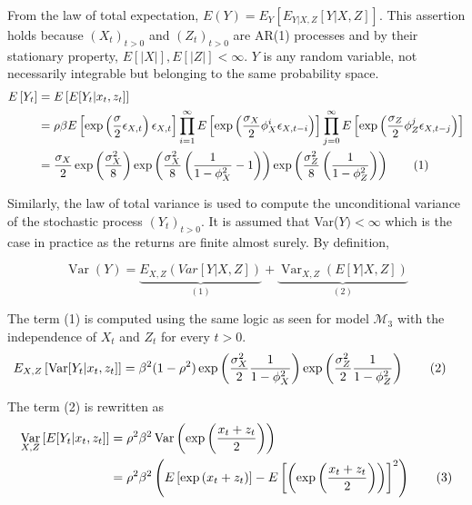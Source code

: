 \documentclass[11pt,a4,twosided,singlespacing,titlepagenumber=on]{scrreprt}
\numberwithin{equation}{chapter} %
\theoremstyle{remark}
\DeclareMathOperator{\var}{Var}
\newcommand\numberthis{\addtocounter{equation}{1}\tag{\theequation}}
\begin{document}
From the law of total expectation, $E(Y) = E_Y\left[ E_{Y|X,Z}[Y | X, Z] \right]$. This assertion holds because $(X_t)_{t>0}$ and $(Z_t)_{t>0}$ are AR(1) processes and by their stationary property, $E[|X|],E[|Z|] < \infty$. $Y$ is any random variable, not necessarily integrable but belonging to the same probability space.
\begin{align*}
E\left[ Y_t \right] &= E\left[ E[Y_t | x_t, z_t] \right] \\
                                  &= \rho \beta E\left[\exp \left( \frac{\sigma}{2} \epsilon_{X,t} \right) \epsilon_{X,t} \right] \prod_{i=1}^\infty E\left[\exp \left( \frac{\sigma_X}{2} \phi_X^i \epsilon_{X, t-i} \right)  \right]  \prod_{j=0}^\infty E\left[\exp \left( \frac{\sigma_Z}{2} \phi_Z^j \epsilon_{X, t-j} \right)  \right] \\
                  &= \frac{\sigma_X}{2} \exp \left(\frac{\sigma_X^2}{8}\right) \exp \left( \frac{\sigma_X^2}{8} \left(\frac{1}{1-\phi_X^{2}} - 1\right)\right) \exp \left( \frac{\sigma_Z^2}{8} \left(\frac{1}{1-\phi_Z^{2}}\right)\right) \numberthis \\
\end{align*}


Similarly, the law of total variance is used to compute the unconditional variance of the stochastic process $(Y_t)_{t>0}$. It is assumed that Var($Y) < \infty$ which is the case in practice as the returns are finite almost surely. By definition,

\begin{equation}
\var(Y) = \underbrace{E_{X,Z}(Var[Y|X,Z])}_{(1)} + \underbrace{\var_{X,Z}(E[Y|X,Z])}_{(2)}
\end{equation}


The term (1) is computed using the same logic as seen for model $\mathcal{M}_3$ with the independence of $X_t$ and $Z_t$ for every $t > 0$.
\begin{align*}
E_{X,Z}\left[ \var[Y_t | x_t, z_t] \right] &= \beta^2 (1-\rho^2) \exp \left( \frac{\sigma_X^2}{2} \frac{1}{1-\phi_X^{2}}\right) \exp \left( \frac{\sigma_Z^2}{2} \frac{1}{1-\phi_Z^{2}}\right) \numberthis
\end{align*}


The term (2) is rewritten as
\begin{align*}
\var_{X,Z} \left[ E[Y_t | x_t, z_t] \right] &= \rho^2 \beta^2 \var \left( \exp \left(\frac{x_t + z_t}{2}\right) \right) \\
                                                  &= \rho^2 \beta^2 \left( E \left[ \exp \left(x_t + z_t\right) \right] - E \left[ \left( \exp \left(\frac{x_t + z_t}{2}\right) \right) \right]^2 \right) \numberthis
\end{align*}
\end{document}
